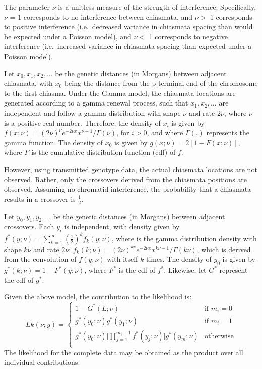 The parameter $\nu$ is a unitless measure of the strength of interference.   
Specifically, $\nu$ = 1 corresponds to no interference between chiasmata, and $\nu>$ 1  
corresponds to positive interference (i.e.\ decreased variance in chiasmata spacing  
than would be expected under a Poisson model), and $\nu<$ 1 corresponds to negative  
interference (i.e.\ increased variance in chiasmata spacing than expected under a  
Poisson model).  

Let $x_0,x_1,x_2,\dots$ be the genetic distances (in Morgans) between adjacent  
chiasmata, with $x_0$ being the distance from the p-terminal end of the chromosome to  
the first chiasma. Under the Gamma model, the chiasmata locations are generated  
according to a gamma renewal process, such that $x_1,x_2,\dots$ are independent and  
follow a gamma distribution with shape $\nu$ and rate 2$\nu$, where $\nu$ is a positive real number.
Therefore, the density of $x_i$ is given by $f(x;\nu) = (2\nu)^\nu e^{-2 \nu x} x^{\nu-1} / \Gamma(\nu)$,
for $i>0$, and where $\Gamma(.)$ represents the gamma function. The density of $x_0$ is given by
$g(x;\nu) = 2 [ 1-F(x;\nu) ]$, where $F$ is the cumulative distribution function (cdf) of $f$.  

However, using transmitted genotype data, the actual chiasmata locations are not observed. 
Rather, only the crossovers derived from the chiasmata positions are observed. Assuming 
no chromatid interference, the probability that a chiasmata results in a crossover is $\frac{1}{2}$.


Let $y_0,y_1,y_2,\dots$ be the genetic distances (in Morgans) between adjacent crossovers.  
Each $y_i$ is independent, with density given  by
$f^*(y;\nu) = \sum^\infty_{k=1} (\frac{1}{2})^k f_k(y;\nu)$,
where is the gamma distribution density with shape $k\nu$ and rate $2\nu$:
$f_k(k;\nu) = (2\nu)^{k \nu} e^{-2 \nu x} x^{k \nu -1} / \Gamma(k \nu)$,
which is derived from the convolution of $f(y;\nu)$ with itself $k$ times. 
The density of $y_0$ is given by $g^*(k;\nu) = 1 - F^*(y;\nu)$, where $F^*$  is the cdf of 
$f^*$. Likewise, let $G^*$ represent the cdf of $g^*$.  

Given the above model, the contribution to the likelihood is:   
\begin{equation}
    Lk(\nu;y) = 
    \begin{cases}
        1 - G^*(L;\nu)
        & \text{if $m_i = 0$} \\

        g^*(y_0;\nu) g^*(y_1;\nu)
        & \text{if $m_i = 1$} \\

        \displaystyle g^*(y_0;\nu) \Bigg[ \prod_{j=1}^{m_i-1} f^*(y_j;\nu) \Bigg] g^*(y_m;\nu)
        & \text{otherwise} \\

    \end{cases}
\end{equation}
The likelihood for the complete data may be obtained as the product over all individual contributions.   

